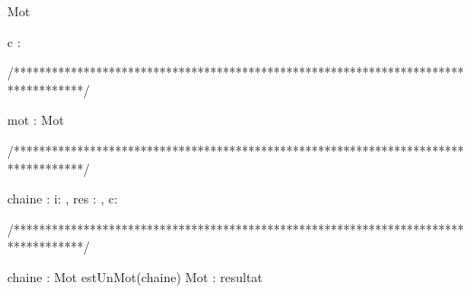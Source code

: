 \begin{algorithme}
    
    \begin{enregistrement}{Mot}%
    \end{enregistrement}

      {c : \caractere}%
      {\booleen}%
      {}%
      {
      }
\end{algorithme}

/***********************************************************************************/
\begin{algorithme}
       {mot : Mot}%
       {\entier}%
       {}%
       {
         

        }
\end{algorithme}

/***********************************************************************************/
\begin{algorithme}
     {chaine : \chaine}%
     {\booleen}%
     {i: \entier, res : \booleen, c: \caractere}%
     {     

        	{
        	}%
        	{

			   {
				  {
				  }%
		           }%
                }%
        
      }
  
\end{algorithme}

/***********************************************************************************/
\begin{algorithme}
    {chaine : \chaine}%
    {Mot}%
    {estUnMot(chaine)}%
    {Mot : resultat}%
    {
    }
\end{algorithme}

